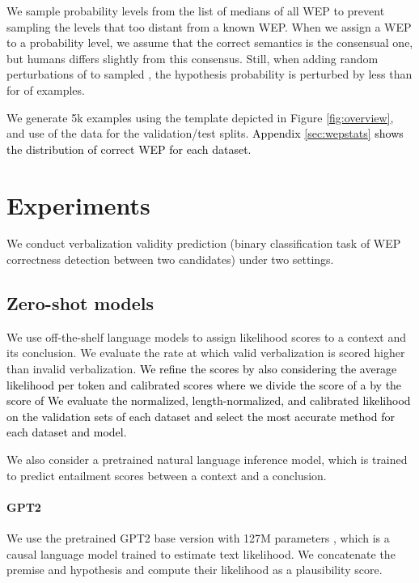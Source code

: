 \documentclass[11pt]{article}
\def \thecolor {black}
\newcommand{\blue}[1]{\textcolor{\thecolor}{#1}}
\begin{document}
We sample probability levels from the list of medians of all WEP to prevent sampling the levels that too distant from a known WEP. When we assign a WEP to a probability level, we assume that the correct semantics is the consensual one, but humans differs slightly from this consensus. Still, when adding random perturbations of  to sampled , the hypothesis probability is perturbed by less than  for  of examples.



We generate 5k examples using the template depicted in Figure \ref{fig:overview}, and use  of the data for the validation/test splits. \blue{Appendix \ref{sec:wepstats} shows the distribution of correct WEP for each dataset.}


\section{Experiments}
We conduct verbalization validity prediction (binary classification task of WEP correctness detection between two candidates) under two settings.
\vspace{-1mm}
\subsection{Zero-shot models}
We use off-the-shelf language models to assign likelihood scores to a context and its conclusion. We evaluate the rate at which valid verbalization is scored higher than invalid verbalization. \blue{
We refine the scores by also considering the average likelihood per token \cite{brown2020language,schick-schutze-2021-exploiting} and calibrated scores \cite{brown2020language,pmlr-v139-zhao21c} where we divide the score of a  by the score of  We evaluate the normalized, length-normalized, and calibrated likelihood on the validation sets of each dataset and select the most accurate method for each dataset and model.}

We also consider a pretrained natural language inference model, which is trained to predict entailment scores between a context and a conclusion.


\paragraph{GPT2} We use the pretrained GPT2 base version with 127M parameters \cite{radford2019language}, which is a causal language model trained to estimate text likelihood. We concatenate the premise and hypothesis and compute their likelihood as a plausibility score.
\vspace{-1mm}
\end{document}

